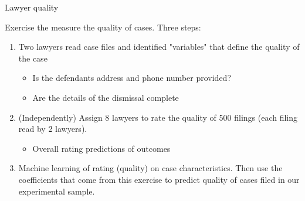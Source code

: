 \documentclass[8pt]{beamer}
\begin{document}


    

\begin{frame}{Lawyer quality}

Exercise the measure the quality of cases. Three steps:
\begin{enumerate}
    \item Two lawyers read case files and identified "variables" that define the quality of the case
    \begin{itemize}
        \item Is the defendants address and phone number provided?
        \item Are the details of the dismissal complete
    \end{itemize}
    \item (Independently) Assign 8 lawyers to rate the quality of 500 filings (each filing read by 2 lawyers). 
    \begin{itemize}
        \item Overall rating
        \incentivized predictions of outcomes
    \end{itemize}
    \item Machine learning of rating (quality) on case characteristics. Then use the coefficients that come from this exercise to predict quality of cases filed in our experimental sample. 
\end{enumerate}
\end{frame}
\end{document}
